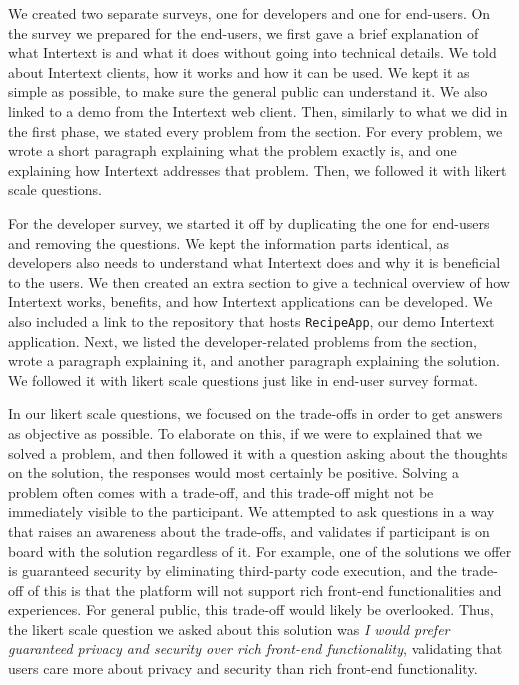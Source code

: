We created two separate surveys, one for developers and one for end-users. On the survey we prepared for the end-users, we first gave a brief explanation of what Intertext is and what it does without going into technical details. We told about Intertext clients, how it works and how it can be used. We kept it as simple as possible, to make sure the general public can understand it. We also linked to a demo from the Intertext web client. Then, similarly to what we did in the first phase, we stated every problem from the  section. For every problem, we wrote a short paragraph explaining what the problem exactly is, and one explaining how Intertext addresses that problem. Then, we followed it with likert scale questions. 

For the developer survey, we started it off by duplicating the one for end-users and removing the questions. We kept the information parts identical, as developers also needs to understand what Intertext does and why it is beneficial to the users. We then created an extra section to give a technical overview of how Intertext works, benefits, and how Intertext applications can be developed. We also included a link to the repository that hosts \texttt{RecipeApp}, our demo Intertext application. Next, we listed the developer-related problems from the  section, wrote a paragraph explaining it, and another paragraph explaining the solution. We followed it with likert scale questions just like in end-user survey format.

In our likert scale questions, we focused on the trade-offs in order to get answers as objective as possible. To elaborate on this, if we were to explained that we solved a problem, and then followed it with a question asking about the thoughts on the solution, the responses would most certainly be positive. Solving a problem often comes with a trade-off, and this trade-off might not be immediately visible to the participant. We attempted to ask questions in a way that raises an awareness about the trade-offs, and validates if participant is on board with the solution regardless of it. For example, one of the solutions we offer is guaranteed security by eliminating third-party code execution, and the trade-off of this is that the platform will not support rich front-end functionalities and experiences. For general public, this trade-off would likely be overlooked. Thus, the likert scale question we asked about this solution was \textit{I would prefer guaranteed privacy and security over rich front-end functionality}, validating that users care more about privacy and security than rich front-end functionality.

